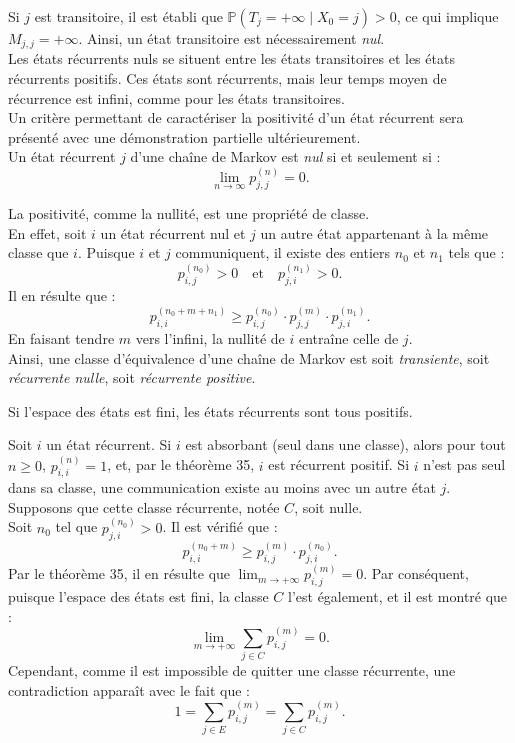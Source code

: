 \begin{sloppypar}
Si $j$ est transitoire, il est établi que $\mathbb{P}(T_j = +\infty \mid X_0 = j) > 0$, ce qui implique $M_{j,j} = +\infty$. Ainsi, un état transitoire est nécessairement \textit{nul}.\\

Les états récurrents nuls se situent entre les états transitoires et les états récurrents positifs. Ces états sont récurrents, mais leur temps moyen de récurrence est infini, comme pour les états transitoires.\\

Un critère permettant de caractériser la positivité d’un état récurrent sera présenté avec une démonstration partielle ultérieurement.\\

Un état récurrent $j$ d’une chaîne de Markov est \textit{nul} si et seulement si :
\[
\lim_{n \to \infty} p^{(n)}_{j,j} = 0.
\]

La positivité, comme la nullité, est une propriété de classe.\\

En effet, soit $i$ un état récurrent nul et $j$ un autre état appartenant à la même classe que $i$. Puisque $i$ et $j$ communiquent, il existe des entiers $n_0$ et $n_1$ tels que :
\[
p^{(n_0)}_{i,j} > 0 \quad \text{et} \quad p^{(n_1)}_{j,i} > 0.
\]
Il en résulte que :
\[
p^{(n_0 + m + n_1)}_{i,i} \geq p^{(n_0)}_{i,j} \cdot p^{(m)}_{j,j} \cdot p^{(n_1)}_{j,i}.
\]
En faisant tendre $m$ vers l’infini, la nullité de $i$ entraîne celle de $j$.\\

Ainsi, une classe d’équivalence d’une chaîne de Markov est soit \textit{transiente}, soit \textit{récurrente nulle}, soit \textit{récurrente positive}.


\begin{tcolorbox}[colback=green!5!white,colframe=green!75!black,title=Proposition]
Si l’espace des états est fini, les états récurrents sont tous positifs.
\end{tcolorbox}  

Soit $i$ un état récurrent. Si $i$ est absorbant (seul dans une classe), alors pour tout $n \geq 0$, $p^{(n)}_{i,i} = 1$, et, par le théorème 35, $i$ est récurrent positif. Si $i$ n’est pas seul dans sa classe, une communication existe au moins avec un autre état $j$. Supposons que cette classe récurrente, notée $C$, soit nulle.\\

Soit $n_0$ tel que $p^{(n_0)}_{j,i} > 0$. Il est vérifié que :
\[
p^{(n_0 + m)}_{i,i} \geq p^{(m)}_{i,j} \cdot p^{(n_0)}_{j,i}.
\]
Par le théorème 35, il en résulte que $\lim_{m \to +\infty} p^{(m)}_{i,j} = 0$. Par conséquent, puisque l’espace des états est fini, la classe $C$ l’est également, et il est montré que :
\[
\lim_{m \to +\infty} \sum_{j \in C} p^{(m)}_{i,j} = 0.
\]
Cependant, comme il est impossible de quitter une classe récurrente, une contradiction apparaît avec le fait que :
\[
1 = \sum_{j \in E} p^{(m)}_{i,j} = \sum_{j \in C} p^{(m)}_{i,j}.
\]


\end{sloppypar}
